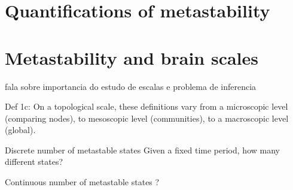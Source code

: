 \documentclass[utf8]{frontiersSCNS} %
\begin{document}
\section{Quantifications of metastability}


\section{Metastability and brain scales}
\cite{tognoli_2014} fala sobre importancia do estudo de escalas e problema de inferencia

Def 1c:
On a topological scale, these definitions vary from a microscopic level (comparing nodes), to mesoscopic level (communities), to a macroscopic level (global). 

Discrete number of metastable states
Given a fixed time period, how many different states?

Continuous number of metastable states
?








\end{document}
